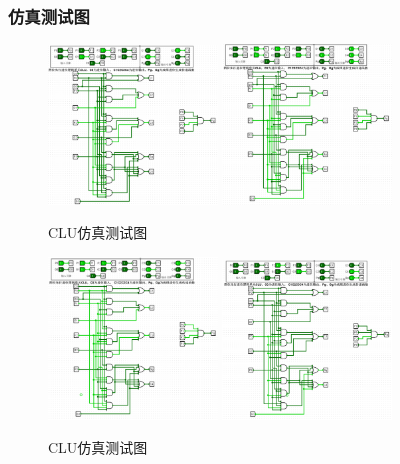 \documentclass{article}
\begin{document}
    \subsubsection{仿真测试图}
    \begin{figure}[H]
    \centering
    \includegraphics[width=0.4\textwidth]{1.5.1.png}
    \includegraphics[width=0.4\textwidth]{1.5.2.png}
    
    \caption{CLU仿真测试图}
    \end{figure}

    \begin{figure}[H]
    \centering
    \includegraphics[width=0.4\textwidth]{1.5.3.png}  
    \includegraphics[width=0.4\textwidth]{1.5.4.png}
    \caption{CLU仿真测试图}
    \end{figure}
    
\end{document}
